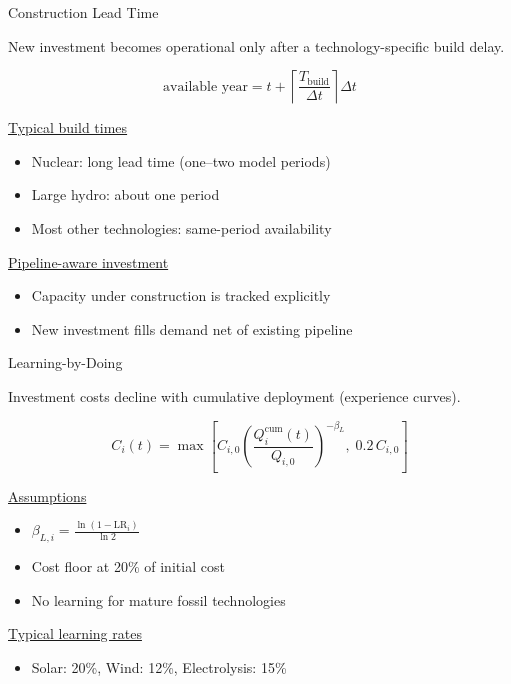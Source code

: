 \documentclass[aspectratio=169,11pt]{beamer}
\begin{document}
\begin{frame}{Construction Lead Time}

\small
New investment becomes operational only after a technology-specific build delay.

\begin{equation*}
\text{available year}
=
t + \left\lceil \frac{T_{\text{build}}}{\Delta t} \right\rceil \Delta t
\end{equation*}


\underline{Typical build times}
\begin{itemize}\small
  \item Nuclear: long lead time (one--two model periods)
  \item Large hydro: about one period
  \item Most other technologies: same-period availability
\end{itemize}

\underline{Pipeline-aware investment}
\begin{itemize}\small
  \item Capacity under construction is tracked explicitly
  \item New investment fills demand net of existing pipeline
\end{itemize}

\end{frame}


\begin{frame}{Learning-by-Doing}

\small
Investment costs decline with cumulative deployment (experience curves).

\vspace{0.6em}

\begin{equation*}
C_i(t)
=
\max\!\left[
C_{i,0}
\left(\frac{Q_i^{\text{cum}}(t)}{Q_{i,0}}\right)^{-\beta_L},
\; 0.2\,C_{i,0}
\right]
\end{equation*}


\underline{Assumptions}
\begin{itemize}\small
  \item $\beta_{L,i} = \frac{\ln(1-\text{LR}_i)}{\ln 2}$
  \item Cost floor at 20\% of initial cost
  \item No learning for mature fossil technologies
\end{itemize}

\vspace{0.6em}

\underline{Typical learning rates}
\begin{itemize}\small
  \item Solar: 20\%, Wind: 12\%, Electrolysis: 15\%
\end{itemize}


\end{frame}
\end{document}
